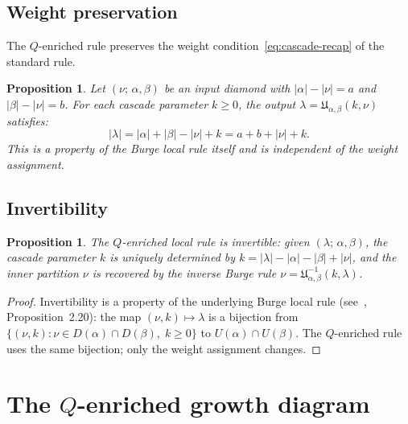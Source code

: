 \documentclass[11pt]{article}
\theoremstyle{plain}
\newtheorem{proposition}[theorem]{Proposition}
\theoremstyle{definition}
\begin{document}
\subsection{Weight preservation}

The $Q$-enriched rule preserves the weight
condition~\eqref{eq:cascade-recap} of the standard rule.

\begin{proposition}\label{prop:weight-preservation}
Let $(\nu;\, \alpha, \beta)$ be an input diamond with
$|\alpha| - |\nu| = a$ and $|\beta| - |\nu| = b$.  For each
cascade parameter $k \geq 0$, the output
$\lambda = \mathfrak{U}_{\alpha,\beta}(k,\nu)$ satisfies:
\begin{equation}\label{eq:weight-balance}
  |\lambda| = |\alpha| + |\beta| - |\nu| + k = a + b + |\nu| + k.
\end{equation}
This is a property of the Burge local rule itself and is
independent of the weight assignment.
\end{proposition}

\subsection{Invertibility}

\begin{proposition}\label{prop:Q-invertible}
The $Q$-enriched local rule is invertible: given
$(\lambda;\, \alpha, \beta)$, the cascade parameter $k$ is
uniquely determined by
$k = |\lambda| - |\alpha| - |\beta| + |\nu|$, and the inner
partition $\nu$ is recovered by the inverse Burge rule
$\nu = \mathfrak{U}_{\alpha,\beta}^{-1}(k, \lambda)$.
\end{proposition}

\begin{proof}
Invertibility is a property of the underlying Burge local rule
(see~\cite{UNDERLYING_SET}, Proposition~2.20): the map
$(\nu, k) \mapsto \lambda$ is a bijection from
$\{(\nu, k) : \nu \in D(\alpha) \cap D(\beta),\; k \geq 0\}$
to $U(\alpha) \cap U(\beta)$.  The $Q$-enriched rule uses the
same bijection; only the weight assignment changes.
\end{proof}


\section{The $Q$-enriched growth diagram}
\label{sec:Q-growth-diagram}
\end{document}

